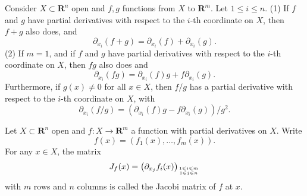 \documentclass[10pt,landscape, a4paper]{article}
\newcommand{\custombox}[3]{\begin{tcolorbox}[left=0mm,right=0mm,bottom=0mm,top=0mm,title = \textbf{#1}, colback=#2!10!white, colframe = #2!70!white, coltitle=white, breakable]
    #3
    \end{tcolorbox}}
\newcommand{\definition}[2]{\custombox{Definition #1}{red}{#2}}
\newcommand{\prop}[2]{\custombox{Proposition #1}{black!50!orange!30!yellow}{#2}}
\begin{document}
\begin{multicols*}{3}
\prop{3.3.7.}{Consider $X \subset \mathbf{R}^{n}$ open and $f, g$ functions from $X$ to $\mathbf{R}^{m}$. Let $1 \leqslant i \leqslant n$.
(1) If $f$ and $g$ have partial derivatives with respect to the $i$-th coordinate on $X$, then $f+g$ also does, and
$$
\partial_{x_{i}}(f+g)=\partial_{x_{i}}(f)+\partial_{x_{i}}(g) .
$$
(2) If $m=1$, and if $f$ and $g$ have partial derivatives with respect to the $i$-th coordinate on $X$, then $f g$ also does and
$$
\partial_{x_{i}}(f g)=\partial_{x_{i}}(f) g+f \partial_{x_{i}}(g) .
$$
Furthermore, if $g(x) \neq 0$ for all $x \in X$, then $f / g$ has a partial derivative with respect to the $i$-th coordinate on $X$, with
$$
\partial_{x_{i}}(f / g)=\left(\partial_{x_{i}}(f) g-f \partial_{x_{i}}(g)\right) / g^{2} .
$$}

\definition{3.3.9.}{Let $X \subset \mathbf{R}^{n}$ open and $f: X \rightarrow \mathbf{R}^{m}$ a function with partial derivatives on $X$. Write
$$
f(x)=\left(f_{1}(x), \ldots, f_{m}(x)\right) .
$$
For any $x \in X$, the matrix
$$
J_{f}(x)=\left(\partial_{x_{j}} f_{i}(x)\right)_{1 \leqslant i \leqslant m \atop 1 \leqslant j \leqslant n}
$$
with $m$ rows and $n$ columns is called the Jacobi matrix of $f$ at $x$.}
\end{multicols*}
\end{document}
